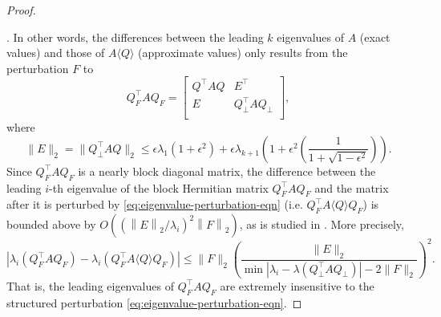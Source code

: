 \documentclass[10pt,a4paper]{amsart}
\begin{document}
\begin{proof}
{\begin{enumerate}
\end{enumerate}}. In other words, the differences between the leading $k$ eigenvalues of $A$ (exact values) and those of $A \langle Q \rangle$ (approximate values) only results from the perturbation $F$ to
\[
    Q_{F}^\top A Q_{F}
    =
    \begin{bmatrix}
        Q^\top A Q & E^\top \\
        E & Q_{\perp}^\top A Q_{\perp} \\
    \end{bmatrix},
\]
where
\[
    \|E\|_2 = \|Q_{\perp}^\top A Q\|_2 \leq \epsilon \lambda_1 \left(1 + \epsilon^2\right) + \epsilon \lambda_{k+1} \left(1 + \epsilon^2 \left(\frac{1}{1 + \sqrt{1 - \epsilon^2}}\right)\right).
\]
Since $Q_{F}^\top A Q_{F}$ is a nearly block diagonal matrix, the difference between the leading $i$-th eigenvalue of the block Hermitian matrix $Q_{F}^\top A Q_{F}$ and the matrix after it is perturbed by \eqref{eq:eigenvalue-perturbation-eqn} (i.e. $Q_{F}^\top A \langle Q \rangle Q_{F}$) is bounded above by $O\left( (\left\|E\right\|_2 / \lambda_{i})^2 \left\|F\right\|_2\right)$, as is studied in \cite[Theorem 3.2]{nakatsukasa2012eigenvalue}. More precisely,
\begin{equation}
    \label{eq:Nystrom-perturbation-eq}
    \left| \lambda_{i}(Q_{F}^\top A Q_{F}) - \lambda_{i}(Q_{F}^\top A \langle Q \rangle Q_{F}) \right|
    \leq
    \|F\|_2 \left(\frac{\|E\|_2}{\min|\lambda_i - \lambda(Q_{\perp}^\top A Q_{\perp})| - 2 \|F\|_2}\right)^2.
\end{equation}
That is, the leading eigenvalues of $Q_{F}^\top A Q_{F}$ are extremely insensitive to the structured perturbation \eqref{eq:eigenvalue-perturbation-eqn}. 


\end{proof}
\end{document}
